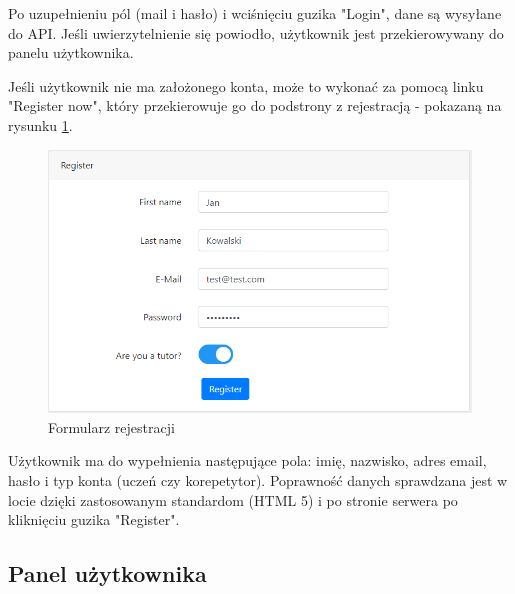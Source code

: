 \documentclass[12pt]{article}
\numberwithin{figure}{section}
\begin{document}
\begin{sloppypar}
Po uzupełnieniu pól (mail i hasło) i wciśnięciu guzika "Login", dane są wysyłane do API. Jeśli uwierzytelnienie się powiodło, użytkownik jest przekierowywany do panelu użytkownika.

Jeśli użytkownik nie ma założonego konta, może to wykonać za pomocą linku "Register now", który przekierowuje go do podstrony z rejestracją - pokazaną na rysunku \ref{fig:register}.
\begin{figure}[!htbp] 
    \centering
    \includegraphics[width=1\textwidth]{images/chapter_4/register.png}
    \caption{Formularz rejestracji}
    \label{fig:register}
\end{figure}

Użytkownik ma do wypełnienia następujące pola: imię, nazwisko, adres email, hasło i typ konta (uczeń czy korepetytor). Poprawność danych sprawdzana jest w locie dzięki zastosowanym standardom (HTML 5) i po stronie serwera po kliknięciu guzika "Register".

\subsection{Panel użytkownika}

\end{sloppypar}
\end{document}
